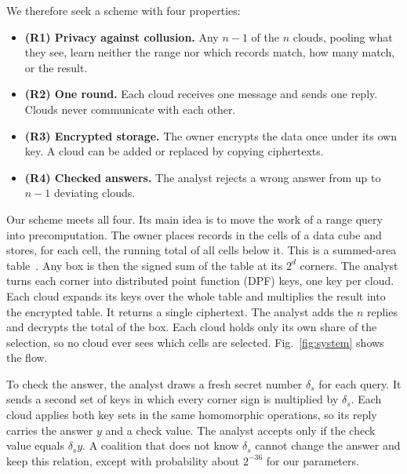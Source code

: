 \documentclass[10pt,journal,compsoc]{IEEEtran}
\begin{document}
We therefore seek a scheme with four properties:
\begin{itemize}
\item \textbf{(R1) Privacy against collusion.} Any $n-1$ of the $n$ clouds, pooling
what they see, learn neither the range nor which records match, how many
match, or the result.
\item \textbf{(R2) One round.} Each cloud receives one message and sends one reply.
Clouds never communicate with each other.
\item \textbf{(R3) Encrypted storage.} The owner encrypts the data once under its own
key. A cloud can be added or replaced by copying ciphertexts.
\item \textbf{(R4) Checked answers.} The analyst rejects a wrong answer from up to
$n-1$ deviating clouds.
\end{itemize}

Our scheme meets all four. Its main idea is to move the work of a range query
into precomputation. The owner places records in the cells of a data cube and
stores, for each cell, the running total of all cells below it. This is a
summed-area table~\cite{crow1984summed,ho1997range}. Any box is then the
signed sum of the table at its $2^d$ corners. The analyst turns each corner
into distributed point function (DPF) keys, one key per cloud. Each cloud
expands its keys over the whole table and multiplies the result into the
encrypted table. It returns a single ciphertext. The analyst adds the $n$
replies and decrypts the total of the box. Each cloud holds only its own share
of the selection, so no cloud ever sees which cells are selected.
Fig.~\ref{fig:system} shows the flow.

To check the answer, the analyst draws a fresh secret number $\delta_s$ for
each query. It sends a second set of keys in which every corner sign is
multiplied by $\delta_s$. Each cloud applies both key sets in the same
homomorphic operations, so its reply carries the answer $y$ and a check value.
The analyst accepts only if the check value equals $\delta_s y$. A coalition
that does not know $\delta_s$ cannot change the answer and keep this relation,
except with probability about $2^{-36}$ for our parameters.
\end{document}
